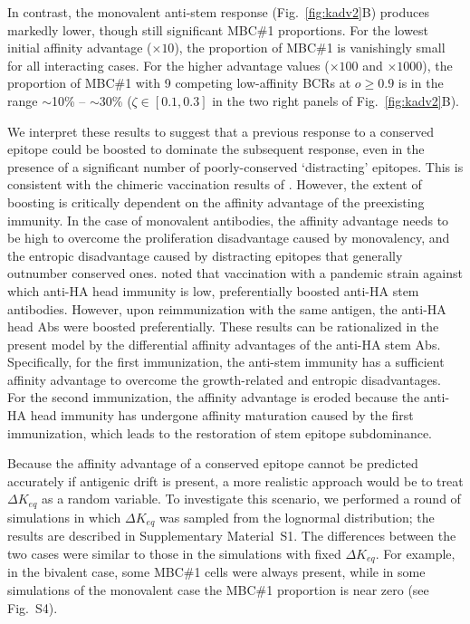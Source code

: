 \documentclass[utf8]{frontiersHLTH}%
\newcommand{\vo}[1]{#1} %
\newcommand{\fig}[1]{Fig.~\ref{fig:#1}}
\newcommand{\SI}{Supplementary Material}
\newcommand{\occl}{o}
\begin{document}
In contrast, the monovalent anti-stem response (\fig{kadv2}B) produces
markedly lower, though still significant MBC\#1 proportions. For the
lowest initial affinity advantage ($\times 10$), the proportion of MBC\#1 is
vanishingly small for all interacting cases. For the higher advantage values
($\times 100$ and $\times 1000$), the proportion of MBC\#1 with 9 competing low-affinity
BCRs at $\occl\ge 0.9$ is in the range $\sim$10\% -- $\sim$30\%
\vo{($\zeta\in[0.1,0.3]$ in the two right panels of \fig{kadv2}B).}

We interpret these results to suggest that a previous response to a conserved
epitope could be boosted to dominate the subsequent response, even in the
presence of a significant number of poorly-conserved `distracting'
epitopes.  This is consistent with the chimeric vaccination results of
\citet{nachbagauer17a}. However, the extent of boosting is
critically dependent on the affinity advantage of the preexisting
immunity. In the case of monovalent antibodies, the affinity
advantage needs to be high to \vo{overcome} the proliferation
disadvantage caused by monovalency, and the entropic disadvantage
caused by distracting epitopes that generally outnumber conserved ones.
\citet{ellebedy14} noted that vaccination with a pandemic strain against
which anti-HA head immunity is low, preferentially boosted anti-HA stem
antibodies. However, upon reimmunization with the same antigen, the
anti-HA head Abs were boosted preferentially. These results can be
rationalized in the present model by the
differential affinity advantages of the anti-HA stem Abs.  Specifically, for the first
immunization, the anti-stem immunity has a sufficient affinity advantage
to overcome the growth-related and entropic disadvantages. For the second
immunization, the affinity advantage is eroded because the anti-HA head
immunity has undergone affinity maturation caused by the first
immunization, which leads to the restoration of stem epitope
subdominance.

Because the affinity advantage of a conserved epitope cannot be predicted
accurately if antigenic drift is present, a more realistic approach would
be to treat $\Delta K_{eq}$ as a random variable. To investigate this
scenario, we performed a round of simulations in which $\Delta K_{eq}$
was sampled from the lognormal distribution; the results are described in
\SI~S1. The differences between the
two cases were similar to those in the simulations with
fixed $\Delta K_{eq}$. For example, in the bivalent case, some MBC\#1
cells were always present, while in some simulations of the
monovalent case the MBC\#1 proportion is near zero (see Fig.~S4).
\end{document}
